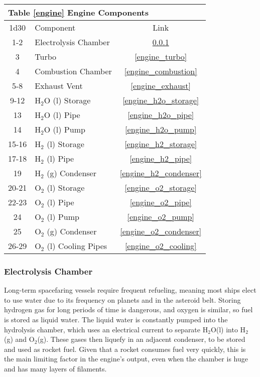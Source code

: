 \documentclass[a4paper]{article}
\begin{document}
\vspace{0.5cm} \hspace{0.25\linewidth}
\begin{tabular}{| c | l | c |}
\toprule
\multicolumn{3}{|l|}{Table \ref{engine} Engine Components} \\
\toprule
1d30 & Component & Link \\
\midrule
1-2 & Electrolysis Chamber & \ref{engine_electrolysis} \\
3 & Turbo & \ref{engine_turbo} \\
4 & Combustion Chamber & \ref{engine_combustion} \\
5-8 & Exhaust Vent & \ref{engine_exhaust} \\
\midrule
9-12 & H$_2$O (l) Storage & \ref{engine_h2o_storage} \\
13 & H$_2$O (l) Pipe & \ref{engine_h2o_pipe} \\
14 & H$_2$O (l) Pump & \ref{engine_h2o_pump} \\
15-16 & H$_2$ (l) Storage & \ref{engine_h2_storage} \\
17-18 & H$_2$ (l) Pipe & \ref{engine_h2_pipe} \\
19 & H$_2$ (g) Condenser & \ref{engine_h2_condenser} \\
20-21 & O$_2$ (l) Storage & \ref{engine_o2_storage} \\
22-23 & O$_2$ (l) Pipe & \ref{engine_o2_pipe} \\
24 & O$_2$ (l) Pump & \ref{engine_o2_pump} \\
25 & O$_2$ (g) Condenser & \ref{engine_o2_condenser} \\
26-29 & O$_2$ (l) Cooling Pipes & \ref{engine_o2_cooling} \\
\bottomrule
\end{tabular}


\hspace{-18pt} \subsubsection{Electrolysis Chamber} \label{engine_electrolysis} \vspace{-0.2cm}
Long-term spacefaring vessels require frequent refueling, meaning most ships elect to use water due to its frequency on planets and in the asteroid belt. Storing hydrogen gas for long periods of time is dangerous, and oxygen is similar, so fuel is stored as liquid water. The liquid water is constantly pumped into the hydrolysis chamber, which uses an electrical current to separate H$_2$O(l) into H$_2$(g) and O$_2$(g). These gases then liquefy in an adjacent condenser, to be stored and used as rocket fuel. Given that a rocket consumes fuel very quickly, this is the main limiting factor in the engine's output, even when the chamber is huge and has many layers of filaments. 
\end{document}
